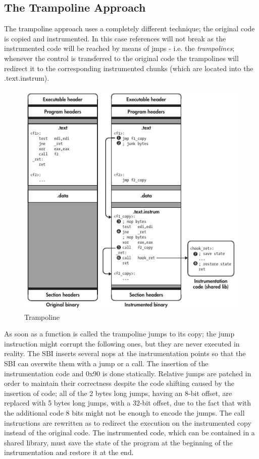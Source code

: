 \subsection{The Trampoline Approach}
The trampoline approach uses a completely different technique; the original code is copied and instrumented. In this
case references will not break as the instrumented code will be reached by means of  {\ttfamily jmp}s - i.e. the
\textit{trampolines}; whenever the control is transferred to the original code the trampolines will redirect it to the
corresponding instrumented chunks (which are located into the {\ttfamily .text.instrum}).
\begin{figure}[bpth]
    \begin{center}
        \includegraphics[scale=0.7]{./pics/trampoline.png}
        \caption{Trampoline}
        \label{trampoline}
    \end{center}
\end{figure}
As soon as a function is called the trampoline jumps to its copy; the jump instruction might corrupt the following ones,
but they are never executed in reality. The SBI inserts several {\ttfamily nop}s at the instrumentation points so that
the SBI can overwite them with a jump or a call. The insertion of the instrumentation code and {\ttfamily 0x90} is done
statically. Relative jumps are patched in order to maintain their correctness despite the code shifting caused by the
insertion of code; all of the 2 bytes long jumps, having an 8-bit offset, are replaced with 5 bytes long jumps, with a
32-bit offset, due to the fact that with the additional code 8 bits might not be enough to encode the jumps. The
{\ttfamily call} instructions are rewritten as to redirect the execution on the instrumented copy instead of the
original code. The instrumented code, which can be contained in a shared library, must save the state of the program at
the beginning of the instrumentation and restore it at the end.

